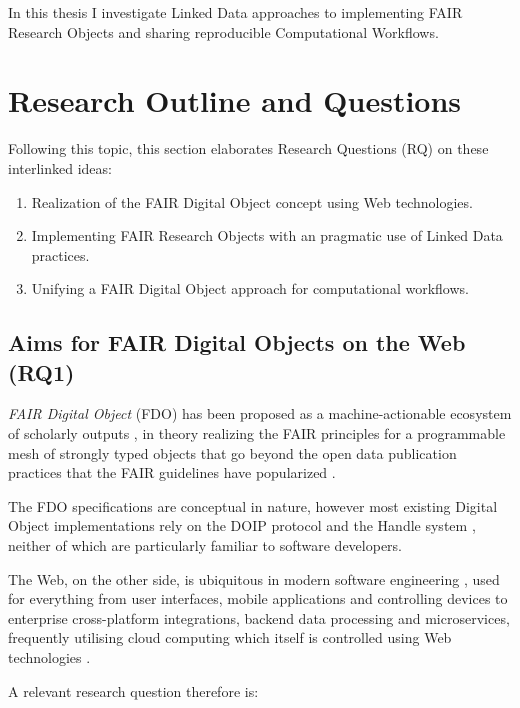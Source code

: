 In this thesis I investigate Linked Data approaches to implementing FAIR Research Objects and sharing reproducible Computational Workflows.

\section{Research Outline and Questions}
\label{intro:outline}

Following this topic, this section elaborates Research Questions (RQ) on these interlinked ideas:

\begin{enumerate}
    \item Realization of the FAIR Digital Object concept using Web technologies.
    \item Implementing FAIR Research Objects with an pragmatic use of Linked Data practices.
    \item Unifying a FAIR Digital Object approach for computational workflows.
\end{enumerate}


\subsection{Aims for FAIR Digital Objects on the Web (RQ1)}
\label{intro:rq1}

\emph{FAIR Digital Object} (FDO) has been proposed as a machine-actionable ecosystem of scholarly outputs \cite{Schultes 2019}, in theory realizing the FAIR principles \cite{Wilkinson 2016} for a programmable mesh of strongly typed objects that go beyond the open data publication practices that the FAIR guidelines have popularized \cite{Jacobsen 2020}.

The FDO specifications \cite{fdo-Overview} are conceptual in nature, however most existing Digital Object implementations \cite{Kahn 2006} rely on the DOIP protocol \cite{DigitalObjectInterface} and the Handle system \cite{rfc3650}, neither of which are particularly familiar to software developers.

The Web, on the other side, is ubiquitous in modern software engineering \cite{Taivalsaari 2021}, used for everything from user interfaces, mobile applications and controlling devices to enterprise cross-platform integrations, backend data processing and microservices, frequently utilising cloud computing which itself is controlled using Web technologies \cite{Marinescu 2022}.

A relevant research question therefore is: 

